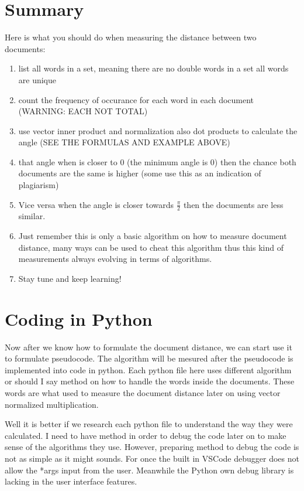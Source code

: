 \documentclass{article}
\begin{document}
    \section*{Summary}
    Here is what you should do when measuring the distance between two documents:
    \begin{enumerate}
        \item list all words in a set, meaning there are no double words in a set all words are unique
        \item count the frequency of occurance for each word in each document (WARNING: EACH NOT TOTAL)
        \item use vector inner product and normalization also dot products to calculate the angle (SEE THE FORMULAS AND EXAMPLE ABOVE)
        \item that angle when is closer to 0 (the minimum angle is 0) then the chance both documents are the same is higher (some use this as an indication of plagiarism)
        \item Vice versa when the angle is closer towards $\frac{\pi}{2}$ then the documents are less similar.
        \item Just remember this is only a basic algorithm on how to measure document distance, many ways can be used to cheat this algorithm thus this kind of measurements always evolving in terms of algorithms. 
        \item Stay tune and keep learning!
    \end{enumerate}
    \newpage
    \section{Coding in Python}
    Now after we know how to formulate the document distance, we can start use it to formulate pseudocode. 
    The algorithm will be mesured after the pseudocode is implemented into code in python.
    Each python file here uses different algorithm or should I say method on how to handle the words inside the documents.
    These words are what used to measure the document distance later on using vector normalized multiplication.

    Well it is better if we research each python file to understand the way they were calculated. 
    I need to have method in order to debug the code later on to make sense of the algorithms they use.
    However, preparing method to debug the code is not as simple as it might sounds.
    For once the built in VSCode debugger does not allow the *args input from the user. 
    Meanwhile the Python own debug library is lacking in the user interface features.
\end{document}
